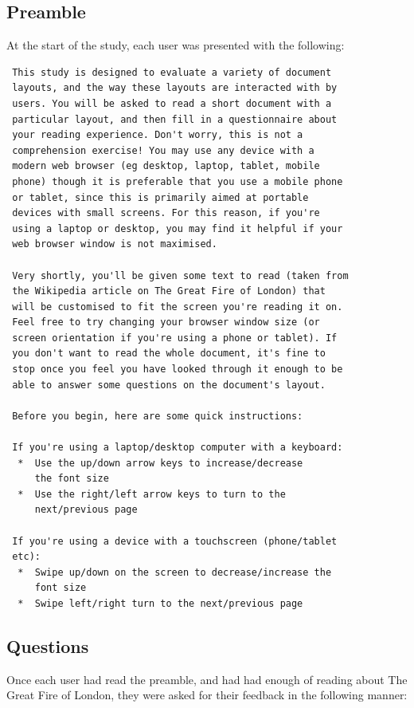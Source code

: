 \subsection{Preamble}
At the start of the study, each user was presented with the following:
\begin{verbatim}
 This study is designed to evaluate a variety of document
 layouts, and the way these layouts are interacted with by
 users. You will be asked to read a short document with a
 particular layout, and then fill in a questionnaire about
 your reading experience. Don't worry, this is not a
 comprehension exercise! You may use any device with a
 modern web browser (eg desktop, laptop, tablet, mobile
 phone) though it is preferable that you use a mobile phone
 or tablet, since this is primarily aimed at portable
 devices with small screens. For this reason, if you're
 using a laptop or desktop, you may find it helpful if your
 web browser window is not maximised.

 Very shortly, you'll be given some text to read (taken from
 the Wikipedia article on The Great Fire of London) that
 will be customised to fit the screen you're reading it on.
 Feel free to try changing your browser window size (or
 screen orientation if you're using a phone or tablet). If
 you don't want to read the whole document, it's fine to
 stop once you feel you have looked through it enough to be
 able to answer some questions on the document's layout.

 Before you begin, here are some quick instructions:

 If you're using a laptop/desktop computer with a keyboard:
  *  Use the up/down arrow keys to increase/decrease
     the font size
  *  Use the right/left arrow keys to turn to the
     next/previous page

 If you're using a device with a touchscreen (phone/tablet
 etc):
  *  Swipe up/down on the screen to decrease/increase the
     font size
  *  Swipe left/right turn to the next/previous page
\end{verbatim}



\subsection{Questions}
\label{sec:surveyqs}
Once each user had read the preamble, and had had enough of reading about The Great Fire of London, they were asked for their feedback in the following manner:

